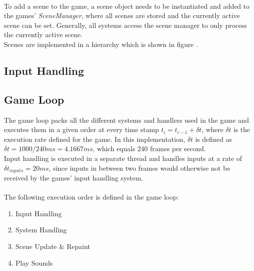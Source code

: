 \\
To add a scene to the game, a scene object needs to be instantiated and added to the games' \textit{SceneManager}, where all
scenes are stored and the currently active scene can be set.
Generally, all systems access the scene manager to only process the currently active scene.
\\

Scenes are implemented in a hierarchy which is shown in figure .
\subsection{Input Handling}\label{subsec:input-handling}

\subsection{Game Loop}\label{subsec:game-loop}
The game loop packs all the different systems and handlers used in the game and executes them in a given order at every time stamp
$t_{i} = t_{i-1} + \delta t$, where $\delta t$ is the execution rate defined for the game.
In this implementation, $\delta t$ is defined as $\delta t = 1000 / 240 ms = 4.1667 ms$, which equals 240 frames per second.
\\
Input handling is executed in a separate thread and handles inputs at a rate of $\delta t_{inputs} = 20 ms$, since inputs in between two frames
would otherwise not be received by the games' input handling system.
\\ \\
The following execution order is defined in the game loop:

\begin{enumerate}
    \item Input Handling
    \item System Handling
    \item Scene Update \& Repaint
    \item Play Sounds
\end{enumerate}

